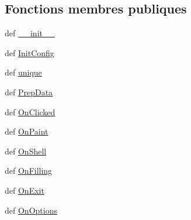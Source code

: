 \subsection*{Fonctions membres publiques}
\begin{DoxyCompactItemize}
\item 
def \hyperlink{classwxpy__aot__pm10__by__year__sep__x__2009__v2_1_1_canvas_frame_a2f3402930df5b23c70a05bb2b02fecbb}{\-\_\-\-\_\-init\-\_\-\-\_\-}
\item 
def \hyperlink{classwxpy__aot__pm10__by__year__sep__x__2009__v2_1_1_canvas_frame_a4921677b5c61ea75dcf891e3aa3d2922}{Init\-Config}
\item 
def \hyperlink{classwxpy__aot__pm10__by__year__sep__x__2009__v2_1_1_canvas_frame_a58c0b0c678af77c0bb9532695088ce87}{unique}
\item 
def \hyperlink{classwxpy__aot__pm10__by__year__sep__x__2009__v2_1_1_canvas_frame_abed7d4c6d1c6bb71a74f05ca5b4efd70}{Prep\-Data}
\item 
def \hyperlink{classwxpy__aot__pm10__by__year__sep__x__2009__v2_1_1_canvas_frame_a3c6d3e08e4096e060f76cc27d1593225}{On\-Clicked}
\item 
def \hyperlink{classwxpy__aot__pm10__by__year__sep__x__2009__v2_1_1_canvas_frame_aebe11aecfef9635030426edeb0121e74}{On\-Paint}
\item 
def \hyperlink{classwxpy__aot__pm10__by__year__sep__x__2009__v2_1_1_canvas_frame_a62c6659283638fe5e86058df99ecd02a}{On\-Shell}
\item 
def \hyperlink{classwxpy__aot__pm10__by__year__sep__x__2009__v2_1_1_canvas_frame_a57994e58517d8339b7ef7f51b6631554}{On\-Filling}
\item 
def \hyperlink{classwxpy__aot__pm10__by__year__sep__x__2009__v2_1_1_canvas_frame_abb0238138da028f98cb1df5dde47c2a4}{On\-Exit}
\item 
def \hyperlink{classwxpy__aot__pm10__by__year__sep__x__2009__v2_1_1_canvas_frame_a179878bf0c7ba265837f2786fb4bfeab}{On\-Options}
\end{DoxyCompactItemize}
